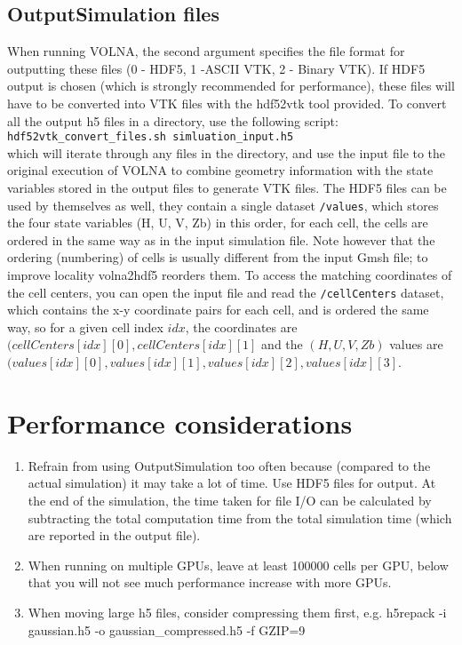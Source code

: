 \documentclass[11pt]{article}
\begin{document}
\subsection{OutputSimulation files}
When running VOLNA, the second argument specifies the file format for outputting these files (0 - HDF5, 1 -ASCII VTK, 2 - Binary VTK). If HDF5 output is chosen (which is strongly recommended for performance), these files will have to be converted into VTK files with the hdf52vtk tool provided. To convert all the output h5 files in a directory, use the following script:\\
{\tt hdf52vtk\_convert\_files.sh simluation\_input.h5}\\
which will iterate through any files in the directory, and use the input file to the original execution of VOLNA to combine geometry information with the state variables stored in the output files to generate VTK files.
The HDF5 files can be used by themselves as well, they contain a single dataset \texttt{/values}, which stores the four state variables (H, U, V, Zb) in this order, for each cell, the cells are ordered in the same way as in the input simulation file. Note however that the ordering (numbering) of cells is usually different from the input Gmsh file; to improve locality volna2hdf5 reorders them. To access the matching coordinates of the cell centers, you can open the input file and read the \texttt{/cellCenters} dataset, which contains the x-y coordinate pairs for each cell, and is ordered the same way, so for a given cell index $idx$, the coordinates are $(cellCenters[idx][0], cellCenters[idx][1]$ and the $(H,U,V,Zb)$ values are $(values[idx][0],values[idx][1],values[idx][2],values[idx][3]$.

\section{Performance considerations}
\begin{enumerate}
\item Refrain from using OutputSimulation too often because (compared to the actual simulation) it may take a lot of time. Use HDF5 files for output. At the end of the simulation, the time taken for file I/O can be calculated by subtracting the total computation time from the total simulation time (which are reported in the output file).
\item When running on multiple GPUs, leave at least 100000 cells per GPU, below that you will not see much performance increase with more GPUs. 
\item When moving large h5 files, consider compressing them first, e.g. h5repack -i gaussian.h5 -o gaussian\_compressed.h5 -f GZIP=9
\end{enumerate}
\end{document}
